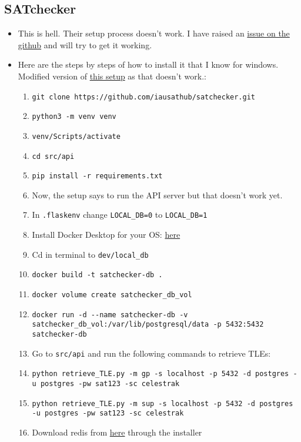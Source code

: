 \documentclass[../main.tex]{subfiles}
\begin{document}
\subsection{SATchecker}
\begin{itemize}
    \item This is hell. Their setup process doesn't work. I have raised an \href{https://github.com/iausathub/satchecker/issues/157}{issue on the github} and will try to get it working.
    \item Here are the steps by steps of how to install it that I know for windows. Modified version of \href{https://github.com/iausathub/satchecker/wiki/setup}{this setup} as that doesn't work.: \begin{enumerate}
        \item \verb|git clone https://github.com/iausathub/satchecker.git|
        \item \verb|python3 -m venv venv|
        \item \verb|venv/Scripts/activate|
        \item \verb|cd src/api|
        \item \verb|pip install -r requirements.txt|
        \item Now, the setup says to run the API server but that doesn't work yet.
        \item In \verb|.flaskenv| change \verb|LOCAL_DB=0| to \verb|LOCAL_DB=1|
        \item Install Docker Desktop for your OS: \href{https://www.docker.com/products/docker-desktop}{here}
        \item Cd in terminal to \verb|dev/local_db|
        \item \verb|docker build -t satchecker-db .|
        \item \verb|docker volume create satchecker_db_vol|
        \item \verb|docker run -d --name satchecker-db -v satchecker_db_vol:/var/lib/postgresql/data -p 5432:5432 satchecker-db|
        \item Go to \verb|src/api| and run the following commands to retrieve TLEs:
        \item \verb|python retrieve_TLE.py -m gp -s localhost -p 5432 -d postgres -u postgres -pw sat123 -sc celestrak|
        \item \verb|python retrieve_TLE.py -m sup -s localhost -p 5432 -d postgres -u postgres -pw sat123 -sc celestrak|
        \item Download redis from \href{https://github.com/tporadowski/redis/releases}{here} through the installer

\end{enumerate}
\end{itemize}
\end{document}
